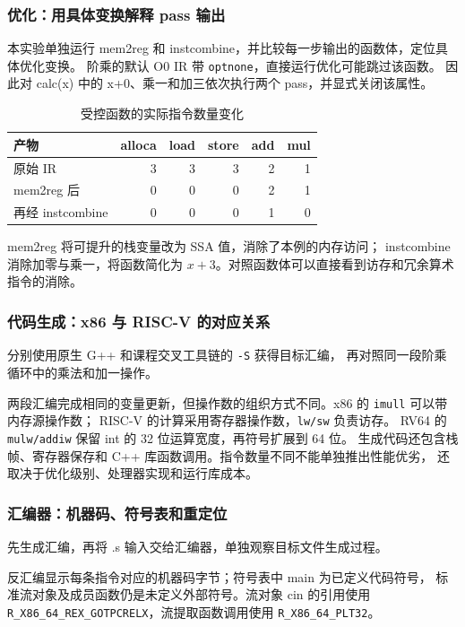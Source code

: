 \subsubsection{优化：用具体变换解释 pass 输出}
本实验单独运行 mem2reg 和 instcombine，并比较每一步输出的函数体，定位具体优化变换。
阶乘的默认 O0 IR 带 \texttt{optnone}，直接运行优化可能跳过该函数。
因此对 calc(x) 中的 x+0、乘一和加三依次执行两个 pass，并显式关闭该属性。

\begin{table}[htbp]
\centering
\caption{受控函数的实际指令数量变化}
\begin{tabular}{lrrrrr}
\toprule 产物 & alloca & load & store & add & mul\\\midrule
原始 IR & 3 & 3 & 3 & 2 & 1\\
mem2reg 后 & 0 & 0 & 0 & 2 & 1\\
再经 instcombine & 0 & 0 & 0 & 1 & 0\\
\bottomrule
\end{tabular}
\end{table}

mem2reg 将可提升的栈变量改为 SSA 值，消除了本例的内存访问；
instcombine 消除加零与乘一，将函数简化为 $x+3$。对照函数体可以直接看到访存和冗余算术指令的消除。

\subsubsection{代码生成：x86 与 RISC-V 的对应关系}

分别使用原生 G++ 和课程交叉工具链的 \texttt{-S} 获得目标汇编，
再对照同一段阶乘循环中的乘法和加一操作。

两段汇编完成相同的变量更新，但操作数的组织方式不同。x86 的 \texttt{imull} 可以带内存源操作数；
RISC-V 的计算采用寄存器操作数，\texttt{lw/sw} 负责访存。
RV64 的 \texttt{mulw/addiw} 保留 int 的 32 位运算宽度，再符号扩展到 64 位。
生成代码还包含栈帧、寄存器保存和 C++ 库函数调用。指令数量不同不能单独推出性能优劣，
还取决于优化级别、处理器实现和运行库成本。


\subsubsection{汇编器：机器码、符号表和重定位}
先生成汇编，再将 .s 输入交给汇编器，单独观察目标文件生成过程。

反汇编显示每条指令对应的机器码字节；符号表中 main 为已定义代码符号，
标准流对象及成员函数仍是未定义外部符号。流对象 cin 的引用使用
\texttt{R\_X86\_64\_REX\_GOTPCRELX}，流提取函数调用使用 \texttt{R\_X86\_64\_PLT32}。

